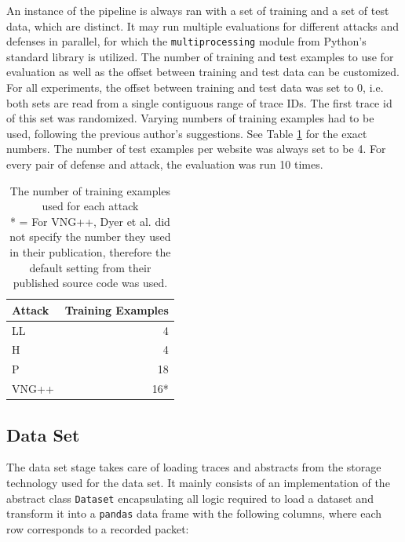 \documentclass[
	ruledheaders=chapter,
	class=report,
	thesis={type=master, department=inf},
	accentcolor=1c,
	custommargins=true,
	marginpar=false,
	parskip=half-,
	fontsize=11pt,
]{tudapub}
\begin{document}
	An instance of the pipeline is always ran with a set of training and a set of test data, which are distinct. It may run multiple evaluations for different attacks and defenses in parallel, for which the \texttt{multiprocessing} module from Python's standard library is utilized. The number of training and test examples to use for evaluation as well as the offset between training and test data can be customized. For all experiments, the offset between training and test data was set to 0, i.e. both sets are read from a single contiguous range of trace IDs. The first trace id of this set was randomized. Varying numbers of training examples had to be used, following the previous author's suggestions. See Table \ref{tbl:train} for the exact numbers. The number of test examples per website was always set to be 4. For every pair of defense and attack, the evaluation was run 10 times.
	
	\begin{table}
		\centering
		\begin{tabular}{|l|r|}
			\hline \textbf{Attack} & \textbf{Training Examples} \\
			\hline LL \cite{Liberatore2006} & 4 \\
			\hline H \cite{Herrmann2009} & 4 \\
			\hline P \cite{Panchenko2011} & 18\\
			\hline VNG++ \cite{Dyer2012} & 16*\\
			\hline
		\end{tabular}
		\caption[The number of training examples used for each attack]{The number of training examples used for each attack\\{*} = For VNG++, Dyer et al. did not specify the number they used in their publication, therefore the default setting from their published source code was used.}
		\label{tbl:train}
	\end{table}
	
	\subsection{Data Set}
	
	The data set stage takes care of loading traces and abstracts from the storage technology used for the data set. It mainly consists of an implementation of the abstract class \texttt{Dataset} encapsulating all logic required to load a dataset and transform it into a \texttt{pandas} data frame with the following columns, where each row corresponds to a recorded packet:
	
\end{document}
